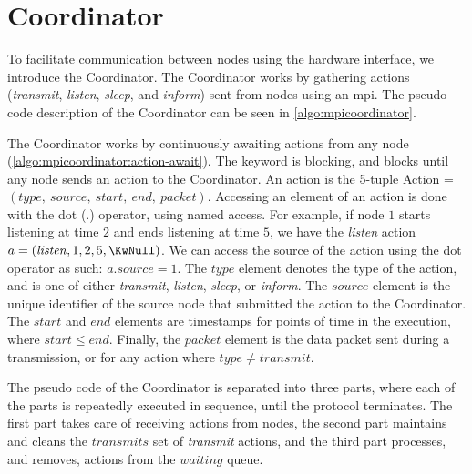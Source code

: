 \section{Coordinator}\label{sec:coordinator}

To facilitate communication between nodes using the hardware interface, we introduce the Coordinator. The
Coordinator works by gathering actions (\textit{transmit}, \textit{listen}, \textit{sleep}, and
\textit{inform}) sent from nodes using an \gls{mpi}. The pseudo code description of the Coordinator can be
seen in \autoref{algo:mpicoordinator}. \smallbreak

The Coordinator works by continuously awaiting actions from any node
(\autoref{algo:mpicoordinator:action-await}). The \KwAwait keyword is blocking, and blocks until any node
sends an action to the Coordinator. An action is the 5-tuple Action = $(\mathit{type},\ \mathit{source},\
\mathit{start},\ \mathit{end},\ \mathit{packet})$. Accessing an element of an action is done with the dot
($.$) operator, using named access. For example, if node $1$ starts listening at time $2$ and ends listening
at time $5$, we have the \textit{listen} action $a = (\mathit{listen}, 1, 2, 5, \KwNull)$. We can access the
source of the action using the dot operator as such: $a.source = 1$. The $\mathit{type}$ element denotes the
type of the action, and is one of either \textit{transmit}, \textit{listen}, \textit{sleep}, or
\textit{inform}. The $\mathit{source}$ element is the unique identifier of the source node that submitted the
action to the Coordinator. The $\mathit{start}$ and $\mathit{end}$ elements are timestamps for points of time
in the execution, where $\mathit{start} \leq \mathit{end}$. Finally, the $\mathit{packet}$ element is the data
packet sent during a transmission, or \KwNull for any action where $\mathit{type} \neq \mathit{transmit}$.
\smallbreak

The pseudo code of the Coordinator is separated into three parts, where each of the parts is repeatedly
executed in sequence, until the protocol terminates. The first part takes care of receiving actions from
nodes, the second part maintains and cleans the $\mathit{transmits}$ set of \textit{transmit} actions, and the
third part processes, and removes, actions from the $\mathit{waiting}$ queue. \smallbreak

